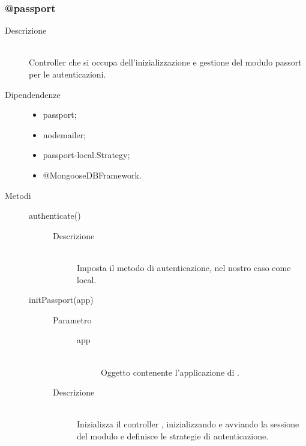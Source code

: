 \subsubsection{@passport}
\begin{description}
 \item[Descrizione] \hfill \\
Controller che si occupa dell'inizializzazione e gestione del modulo passort per le autenticazioni.
\item[Dipendendenze] \hfill
  \begin{itemize}
   \item passport;
   \item nodemailer;
   \item passport-local.Strategy;
   \item @MongooseDBFramework.
  \end{itemize}
   \item[Metodi] \hfill
    \begin{description}
     \item[authenticate()] \hfill 
      \begin{description}
        \item[Descrizione] \hfill \\
          Imposta il metodo di autenticazione, nel nostro caso come local.
      \end{description}
     
     \item[initPassport(app)] \hfill 
     \begin{description}
          \item[Parametro] \hfill
          \begin{description}
           \item[app] \hfill \\
           Oggetto contenente l'applicazione di .
          \end{description}
          \item[Descrizione] \hfill \\
          Inizializza il controller , inizializzando e avviando la sessione del modulo  e definisce le strategie di autenticazione.
            \end{description}
     

\end{description}
\end{description}
